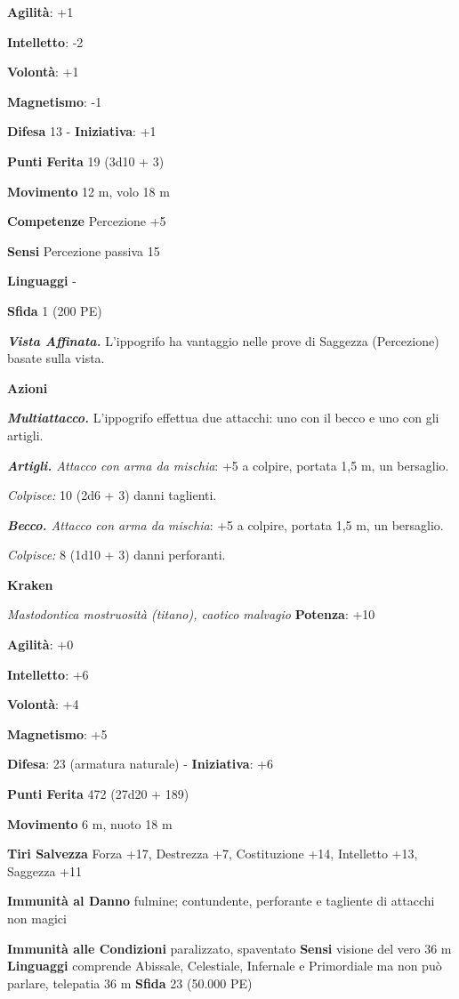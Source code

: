 \begin{multicols}{2}
\textbf{Agilità}: +1

\textbf{Intelletto}: -2

\textbf{Volontà}: +1

\textbf{Magnetismo}: -1

\textbf{Difesa} 13 - \textbf{Iniziativa}: +1

\textbf{Punti Ferita} 19 (3d10 + 3)

\textbf{Movimento} 12 m, volo 18 m

\textbf{Competenze} Percezione +5

\textbf{Sensi} Percezione passiva 15

\textbf{Linguaggi} -

\textbf{Sfida} 1 (200 PE)

\emph{\textbf{Vista Affinata.}} L'ippogrifo ha vantaggio nelle prove di
Saggezza (Percezione) basate sulla vista.

\textbf{Azioni}

\emph{\textbf{Multiattacco.}} L'ippogrifo effettua due attacchi: uno con
il becco e uno con gli artigli.

\emph{\textbf{Artigli.} Attacco con arma da mischia}: +5 a colpire,
portata 1,5 m, un bersaglio.

\emph{Colpisce:} 10 (2d6 + 3) danni taglienti.

\emph{\textbf{Becco.} Attacco con arma da mischia}: +5 a colpire,
portata 1,5 m, un bersaglio.

\emph{Colpisce:} 8 (1d10 + 3) danni perforanti.

\textbf{Kraken}

\emph{Mastodontica mostruosità (titano), caotico malvagio}
\textbf{Potenza}: +10

\textbf{Agilità}: +0

\textbf{Intelletto}: +6

\textbf{Volontà}: +4

\textbf{Magnetismo}: +5

\textbf{Difesa}: 23 (armatura naturale) - \textbf{Iniziativa}: +6

\textbf{Punti Ferita} 472 (27d20 + 189) 

\textbf{Movimento} 6 m, nuoto 18 m

\textbf{Tiri Salvezza} Forza +17, Destrezza +7, Costituzione +14,
Intelletto +13, Saggezza +11

\textbf{Immunità al Danno} fulmine; contundente, perforante e tagliente
di attacchi non magici

\textbf{Immunità alle Condizioni} paralizzato, spaventato \textbf{Sensi}
visione del vero 36 m \textbf{Linguaggi}
comprende Abissale, Celestiale, Infernale e Primordiale ma non può
parlare, telepatia 36 m \textbf{Sfida} 23 (50.000 PE)


\end{multicols}
